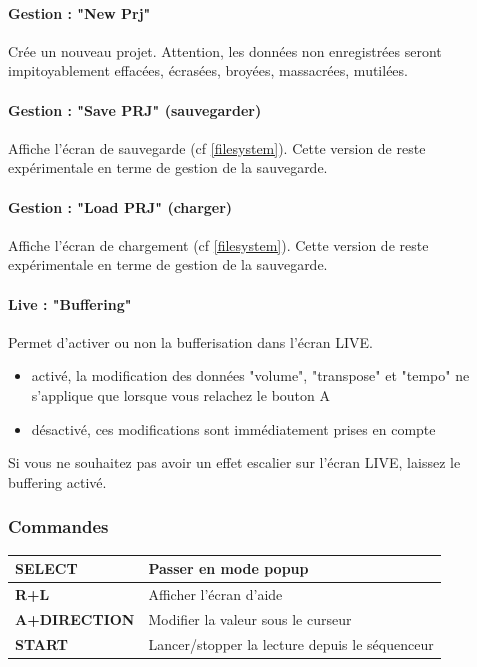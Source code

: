 \documentclass[12pt,a4paper]{article}
\begin{document}
    \paragraph{Gestion : "New Prj"} Crée un nouveau projet.
                                    Attention, les données non enregistrées seront impitoyablement effacées, écrasées, broyées, massacrées, mutilées.

    \paragraph{Gestion : "Save PRJ" (sauvegarder)}  Affiche l'écran de sauvegarde (cf \ref{filesystem}).
                                                    Cette version de \FAT reste expérimentale en terme de gestion de la sauvegarde.

    \paragraph{Gestion : "Load PRJ" (charger)} Affiche l'écran de chargement (cf \ref{filesystem}).
                                Cette version de \FAT reste expérimentale en terme de gestion de la sauvegarde.

    \paragraph{Live : "Buffering"}
    Permet d'activer ou non la bufferisation dans l'écran LIVE.
    \medskip

    \begin{itemize}
        \item{activé, la modification des données "volume", "transpose" et "tempo" ne s'applique que lorsque vous relachez le bouton A}
        \item{désactivé, ces modifications sont immédiatement prises en compte}
    \end{itemize}
    \medskip
    Si vous ne souhaitez pas avoir un effet escalier sur l'écran LIVE, laissez le buffering activé.

    \subsubsection{Commandes}
    \tablelasttail{\hline}
    \begin{supertabular}{|l|p{11cm}|}
    \hline
        {\bf SELECT} & Passer en mode popup \\
        \hline
        {\bf R+L} & Afficher l'écran d'aide \\
        \hline
        {\bf A+DIRECTION} & Modifier la valeur sous le curseur \\
        \hline
        {\bf START} & Lancer/stopper la lecture depuis le séquenceur \\
    \hline
    \end{supertabular}
    
\end{document}
